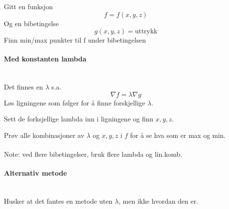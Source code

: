 Gitt en funksjon
$$f = f(x,y,z)$$
Og en bibetingelse
$$g(x,y,z) = \text{uttrykk}$$
Finn min/max punkter til f under bibetingelsen



\paragraph{Med konstanten lambda} \mbox{} \\
Det finnes en $\lambda$ s.a.
$$\nabla f = \lambda \nabla g$$
Løs ligningene som følger for å finne forskjellige $\lambda$.

Sett de forksjellige lambda inn i ligningene og finn $x,y,z$.

Prøv alle kombinasjoner av $\lambda$ og $x,y,z$ i $f$ for å se
hva som er max og min.
\\\\
Note: ved flere bibetingelser, bruk flere lambda og lin.komb.



\paragraph{Alternativ metode} \mbox{} \\
Husker at det fantes en metode uten $\lambda$, men ikke hvordan den er.
